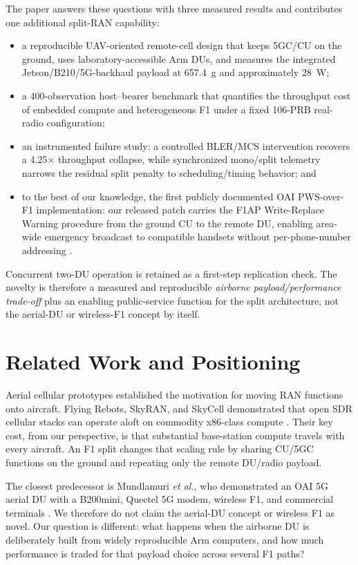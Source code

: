\documentclass[conference]{IEEEtran}
\begin{document}
The paper answers these questions with three measured results and contributes
one additional split-RAN capability:
\begin{itemize}
  \item a reproducible UAV-oriented remote-cell design that keeps 5GC/CU on
  the ground, uses laboratory-accessible Arm DUs, and measures the integrated
  Jetson/B210/5G-backhaul payload at 657.4~g and approximately 28~W;
  \item a 400-observation host--bearer benchmark that quantifies the throughput
  cost of embedded compute and heterogeneous F1 under a fixed 106-PRB
  real-radio configuration;
  \item an instrumented failure study: a controlled BLER/MCS intervention
  recovers a 4.25$\times$ throughput collapse, while synchronized mono/split
  telemetry narrows the residual split penalty to scheduling/timing behavior;
  and
  \item to the best of our knowledge, the first publicly documented OAI
  PWS-over-F1 implementation: our released patch carries the F1AP
  Write-Replace Warning procedure from the ground CU to the remote DU, enabling
  area-wide emergency broadcast to compatible handsets without per-phone-number
  addressing \cite{pwspatch}.
\end{itemize}
Concurrent two-DU operation is retained as a first-step replication check. The
novelty is therefore a measured and reproducible \emph{airborne
payload/performance trade-off} plus an enabling public-service function for the
split architecture, not the aerial-DU or wireless-F1 concept by itself.

\section{Related Work and Positioning}
Aerial cellular prototypes established the motivation for moving RAN functions
onto aircraft. Flying Rebots, SkyRAN, and SkyCell demonstrated that open SDR
cellular stacks can operate aloft on commodity x86-class compute
\cite{gangula2018,chakraborty2018,ferranti2020}. Their key cost, from our
perspective, is that substantial base-station compute travels with every
aircraft. An F1 split changes that scaling rule by sharing CU/5GC functions on
the ground and repeating only the remote DU/radio payload.

The closest predecessor is Mundlamuri \emph{et al.}, who demonstrated an OAI
5G aerial DU with a B200mini, Quectel 5G modem, wireless F1, and commercial
terminals \cite{mundlamuri2023}. We therefore do not claim the aerial-DU
concept or wireless F1 as novel. Our question is different: what happens when
the airborne DU is deliberately built from widely reproducible Arm computers,
and how much performance is traded for that payload choice across several F1
paths?
\end{document}
